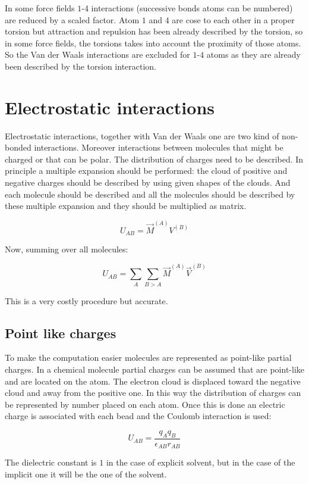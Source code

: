 	In some force fields $1$-$4$ interactions (successive bonds atoms can be numbered) are reduced by a scaled factor.
	Atom $1$ and $4$ are cose to each other in a proper torsion but attraction and repulsion has been already described by the torsion, so in some force fields, the torsions takes into account the proximity of those atoms.
	So the Van der Waals interactions are excluded for $1$-$4$ atoms as they are already been described by the torsion interaction.


\section{Electrostatic interactions}
Electrostatic interactions, together with Van der Waals one are two kind of non-bonded interactions.
Moreover interactions between molecules that might be charged or that can be polar.
The distribution of charges need to be described.
In principle a multiple expansion should be performed: the cloud of positive and negative charges should be described by using given shapes of the clouds.
And each molecule should be described and all the molecules should be described by these multiple expansion and they should be multiplied as matrix.

$$U_{AB} = \vec{M}^{(A)}V^{(B)}$$

Now, summing over all molecules:

$$U_{AB} = \sum\limits_{A}\sum\limits_{B>A}\vec{M}^{(A)}\vec{V}^{(B)}$$

This is a very costly procedure but accurate.

	\subsection{Point like charges}
	To make the computation easier molecules are represented as point-like partial charges.
	In a chemical molecule partial charges can be assumed that are point-like and are located on the atom.
	The electron cloud is displaced toward the negative cloud and away from the positive one.
	In this way the distribution of charges can be represented by number placed on each atom.
	Once this is done an electric charge is associated with each bead and the Coulomb interaction is used:

	$$U_{AB} = \frac{q_Aq_B}{\epsilon_{AB}r_{AB}}$$

	The dielectric constant is $1$ in the case of explicit solvent, but in the case of the implicit one it will be the one of the solvent.

